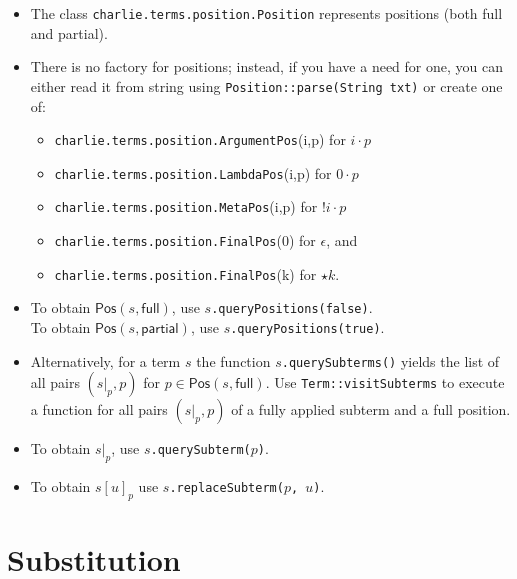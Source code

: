 \documentclass{lmcs}
\theoremstyle{theorem}\newtheorem{theorem}{Theorem}
\theoremstyle{theorem}\newtheorem{lemma}[theorem]{Lemma}
\theoremstyle{theorem}\newtheorem{corollary}[theorem]{Corollary}
\theoremstyle{definition}\newtheorem{definition}[theorem]{Definition}
\theoremstyle{definition}\newtheorem{example}[theorem]{Example}
\newcommand{\Positions}{\mathsf{Pos}}
\begin{document}
\begin{itemize}
\item The class \texttt{charlie.terms.position.Position} represents positions
  (both full and partial).
\item There is no factory for positions; instead, if you have a need for one,
  you can either read it from string using \texttt{Position::parse(String txt)}
  or create one of:
  \begin{itemize}
  \item \texttt{charlie.terms.position.ArgumentPos}(i,p) for $i \cdot p$
  \item \texttt{charlie.terms.position.LambdaPos}(i,p) for $0 \cdot p$
  \item \texttt{charlie.terms.position.MetaPos}(i,p) for $!i \cdot p$
  \item \texttt{charlie.terms.position.FinalPos}(0) for $\epsilon$, and
  \item \texttt{charlie.terms.position.FinalPos}(k) for $\star k$.
  \end{itemize}
\item To obtain $\Positions(s,\mathsf{full})$, use
  \texttt{$s$.queryPositions(false)}. \\
  To obtain $\Positions(s,\mathsf{partial})$, use
  \texttt{$s$.queryPositions(true)}.
\item Alternatively, for a term $s$ the function
  \texttt{$s$.querySubterms()} yields the list of all pairs $(s|_p,p)$ for
  $p \in \Positions(s,\mathsf{full})$.  Use \texttt{Term::visitSubterms} to
  execute a function for all pairs $(s|_p,p)$ of a fully applied subterm and a
  full position.
\item To obtain $s|_p$, use \texttt{$s$.querySubterm($p$)}.
\item To obtain $s[u]_p$ use \texttt{$s$.replaceSubterm($p$, $u$)}.
\end{itemize}

\section{Substitution}
\end{document}

